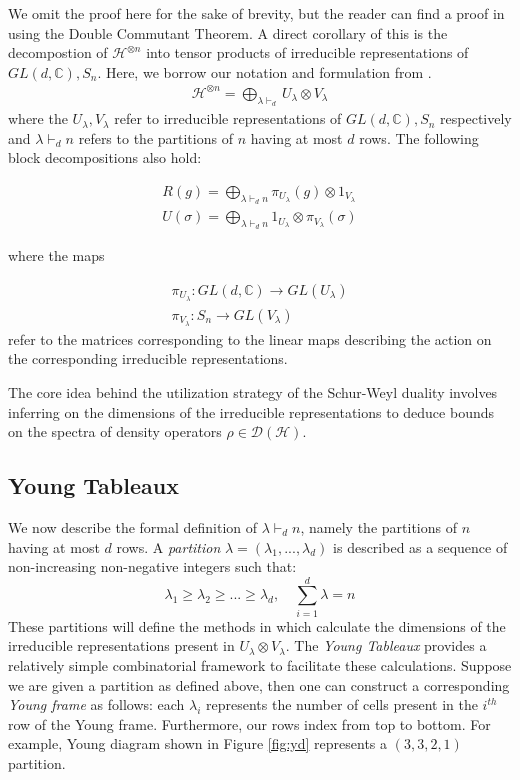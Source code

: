 \documentclass[12pt]{article}%
\begin{document}
We omit the proof here for the sake of brevity, but the reader can find a proof in \cite{GW} using the Double Commutant Theorem. A direct corollary of this is the decompostion of $\mathcal{H}^{\otimes n}$ into tensor products of irreducible representations of $GL(d,\mathbb{C}), S_n$. Here, we borrow our notation and formulation from \cite{botero}.
\begin{gather}
  \mathcal{H}^{\otimes n} = \bigoplus_{\lambda \vdash_d } U_\lambda \otimes V_\lambda
\end{gather}
where the $U_\lambda, V_\lambda$ refer to irreducible representations of $GL(d, \mathbb{C}), S_n$ respectively and $\lambda \vdash_d n$ refers to the partitions of $n$ having at most $d$ rows. The following block decompositions also hold:

\begin{gather}\label{matdecomp}
    R(g) = \bigoplus_{\lambda \vdash_d n} \pi_{U_{\lambda}}(g) \otimes 1_{V_{\lambda}} \\
    U(\sigma) = \bigoplus_{\lambda \vdash_d n} 1_{U_{\lambda}} \otimes \pi_{V_{\lambda}}(\sigma)
\end{gather}

\noindent where the maps

\begin{gather*}
  \pi_{U_{\lambda}}: GL(d, \mathbb{C}) \rightarrow GL(U_\lambda) \\ \pi_{V_{\lambda}}: S_n \rightarrow GL(V_\lambda)
\end{gather*} refer to the matrices corresponding to the linear maps describing the action on the corresponding irreducible representations.

The core idea behind the utilization strategy of the Schur-Weyl duality involves inferring on the dimensions of the irreducible representations to deduce bounds on the spectra of density operators $\rho \in \mathcal{D}(\mathcal{H})$.

\subsection{Young Tableaux}
We now describe the formal definition of $\lambda \vdash_d n$, namely the partitions of $n$ having at most $d$ rows. A \textit{partition} $\lambda = (\lambda_1,...,\lambda_d)$ is described as a sequence of non-increasing non-negative integers such that:
$$ \lambda_1 \geq \lambda_2 \geq ... \geq \lambda_d, \quad \sum_{i=1}^d \lambda = n $$
These partitions will define the methods in which calculate the dimensions of the irreducible representations present in $U_\lambda \otimes V_\lambda$.
The \textit{Young Tableaux} provides a relatively simple combinatorial framework to facilitate these calculations. Suppose we are given a partition as defined above, then one can construct a corresponding \textit{Young frame} as follows: each $\lambda_i$ represents the number of cells present in the $i^{th}$ row of the Young frame. Furthermore, our rows index from top to bottom. For example, Young diagram shown in Figure \ref{fig:yd} represents a $(3,3,2,1)$ partition.
\end{document}
